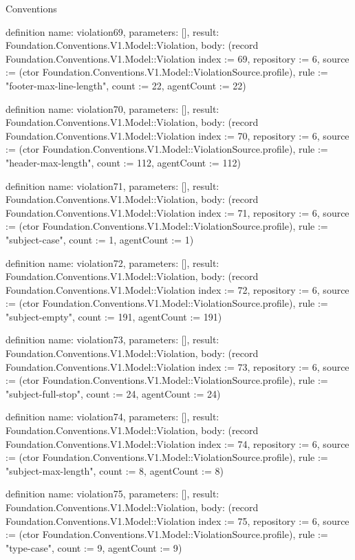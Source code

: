 \begin{lexlean}{Conventions}
\begin{semanticmodule}
definition{
  name: violation69,
  parameters: [],
  result: Foundation.Conventions.V1.Model::Violation,
  body: (record Foundation.Conventions.V1.Model::Violation {index := 69, repository := 6, source := (ctor Foundation.Conventions.V1.Model::ViolationSource.profile), rule := "footer-max-line-length", count := 22, agentCount := 22})
}

definition{
  name: violation70,
  parameters: [],
  result: Foundation.Conventions.V1.Model::Violation,
  body: (record Foundation.Conventions.V1.Model::Violation {index := 70, repository := 6, source := (ctor Foundation.Conventions.V1.Model::ViolationSource.profile), rule := "header-max-length", count := 112, agentCount := 112})
}

definition{
  name: violation71,
  parameters: [],
  result: Foundation.Conventions.V1.Model::Violation,
  body: (record Foundation.Conventions.V1.Model::Violation {index := 71, repository := 6, source := (ctor Foundation.Conventions.V1.Model::ViolationSource.profile), rule := "subject-case", count := 1, agentCount := 1})
}

definition{
  name: violation72,
  parameters: [],
  result: Foundation.Conventions.V1.Model::Violation,
  body: (record Foundation.Conventions.V1.Model::Violation {index := 72, repository := 6, source := (ctor Foundation.Conventions.V1.Model::ViolationSource.profile), rule := "subject-empty", count := 191, agentCount := 191})
}

definition{
  name: violation73,
  parameters: [],
  result: Foundation.Conventions.V1.Model::Violation,
  body: (record Foundation.Conventions.V1.Model::Violation {index := 73, repository := 6, source := (ctor Foundation.Conventions.V1.Model::ViolationSource.profile), rule := "subject-full-stop", count := 24, agentCount := 24})
}

definition{
  name: violation74,
  parameters: [],
  result: Foundation.Conventions.V1.Model::Violation,
  body: (record Foundation.Conventions.V1.Model::Violation {index := 74, repository := 6, source := (ctor Foundation.Conventions.V1.Model::ViolationSource.profile), rule := "subject-max-length", count := 8, agentCount := 8})
}

definition{
  name: violation75,
  parameters: [],
  result: Foundation.Conventions.V1.Model::Violation,
  body: (record Foundation.Conventions.V1.Model::Violation {index := 75, repository := 6, source := (ctor Foundation.Conventions.V1.Model::ViolationSource.profile), rule := "type-case", count := 9, agentCount := 9})
}


\end{semanticmodule}
\end{lexlean}
